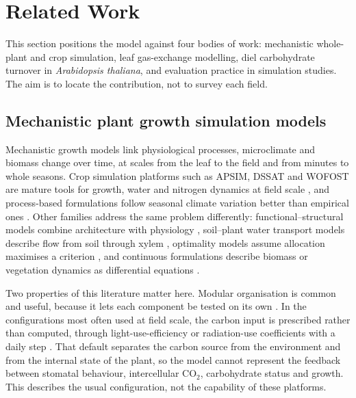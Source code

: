 \section{Related Work}
\label{sec:related}

This section positions the model against four bodies of work: mechanistic
whole-plant and crop simulation, leaf gas-exchange modelling, diel carbohydrate
turnover in \textit{Arabidopsis thaliana}, and evaluation practice in
simulation studies. The aim is to locate the contribution, not to survey each
field.

\subsection{Mechanistic plant growth simulation models}

Mechanistic growth models link physiological processes, microclimate and
biomass change over time, at scales from the leaf to the field and from minutes
to whole seasons. Crop simulation platforms such as APSIM, DSSAT and WOFOST are
mature tools for growth, water and nitrogen dynamics at field scale
\cite{Holzworth2014,Jones2003,deWit2019}, and process-based formulations follow
seasonal climate variation better than empirical ones
\cite{BuckleyPaules2025,Mamassi2024}. Other families address the same problem
differently: functional--structural models combine architecture with
physiology \cite{Louarn2020,Sievnen2014,DeReffye2020}, soil--plant water
transport models describe flow from soil through xylem \cite{Janott2011},
optimality models assume allocation maximises a criterion \cite{Russo2022}, and
continuous formulations describe biomass or vegetation dynamics as differential
equations \cite{Meron2019,ThornleyJohnson1990,Marcelis1996,Feller2015,Thornley1972}.

Two properties of this literature matter here. Modular organisation is common
and useful, because it lets each component be tested on its own
\cite{Sievnen2014,Zeigler2000}. In the configurations most often used at field
scale, the carbon input is prescribed rather than computed, through
light-use-efficiency or radiation-use coefficients with a daily step
\cite{Jones2003,deWit2019,Holzworth2014}. That default separates the carbon
source from the environment and from the internal state of the plant, so the
model cannot represent the feedback between stomatal behaviour, intercellular
CO$_2$, carbohydrate status and growth. This describes the usual configuration,
not the capability of these platforms.

